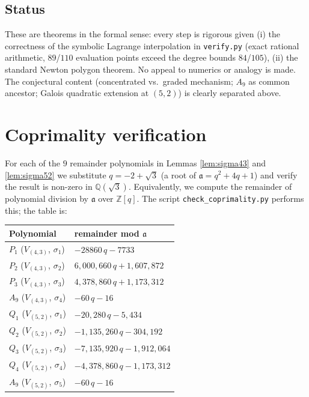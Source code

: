 \documentclass[11pt]{article}
\theoremstyle{plain}
\theoremstyle{definition}
\theoremstyle{remark}
\newcommand{\Z}{\mathbb{Z}}
\newcommand{\Q}{\mathbb{Q}}
\newcommand{\atom}{\mathfrak{a}}
\begin{document}
\subsection{Status}

These are theorems in the formal sense: every step is rigorous given (i) the
correctness of the symbolic Lagrange interpolation in
\texttt{verify.py} (exact rational arithmetic, $89$/$110$ evaluation points exceed
the degree bounds $84$/$105$), (ii) the standard Newton polygon theorem.  No appeal
to numerics or analogy is made.  The conjectural content (concentrated vs.\ graded
mechanism; $A_9$ as common ancestor; Galois quadratic extension at $(5,2)$) is
clearly separated above.

\appendix

\section{Coprimality verification}
\label{app:coprime}

For each of the $9$ remainder polynomials in Lemmas \ref{lem:sigma43} and
\ref{lem:sigma52} we substitute $q = -2 + \sqrt{3}$ (a root of $\atom = q^2 + 4q + 1$)
and verify the result is non-zero in $\Q(\sqrt{3})$.  Equivalently, we compute the
remainder of polynomial division by $\atom$ over $\Z[q]$.  The script
\texttt{check\_coprimality.py} performs this; the table is:

\begin{center}
\begin{tabular}{l|l}
Polynomial & remainder mod $\atom$ \\ \hline
$P_1$ ($V_{(4,3)}$, $\sigma_1$) & $-28860\,q - 7733$ \\
$P_2$ ($V_{(4,3)}$, $\sigma_2$) & $6{,}000{,}660\,q + 1{,}607{,}872$ \\
$P_3$ ($V_{(4,3)}$, $\sigma_3$) & $4{,}378{,}860\,q + 1{,}173{,}312$ \\
$A_9$ ($V_{(4,3)}$, $\sigma_4$) & $-60\,q - 16$ \\
$Q_1$ ($V_{(5,2)}$, $\sigma_1$) & $-20{,}280\,q - 5{,}434$ \\
$Q_2$ ($V_{(5,2)}$, $\sigma_2$) & $-1{,}135{,}260\,q - 304{,}192$ \\
$Q_3$ ($V_{(5,2)}$, $\sigma_3$) & $-7{,}135{,}920\,q - 1{,}912{,}064$ \\
$Q_4$ ($V_{(5,2)}$, $\sigma_4$) & $-4{,}378{,}860\,q - 1{,}173{,}312$ \\
$A_9$ ($V_{(5,2)}$, $\sigma_5$) & $-60\,q - 16$
\end{tabular}
\end{center}
\end{document}
